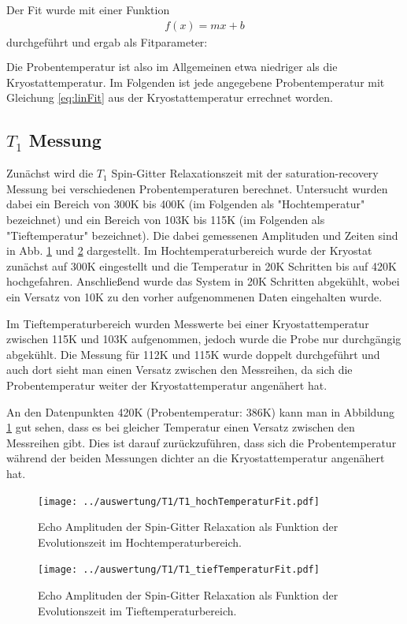 Der Fit wurde mit einer Funktion 
\begin{align}
	f(x) = mx+b
	\label{eq:linFit}
\end{align}
durchgeführt und ergab als Fitparameter:
\begin{align*}
	\\
	
\end{align*}
Die Probentemperatur ist also im Allgemeinen etwa niedriger als die Kryostattemperatur. Im Folgenden ist jede angegebene Probentemperatur mit Gleichung \ref{eq:linFit} aus der Kryostattemperatur errechnet worden. 
\subsection{$T_1$ Messung}
Zunächst wird die $T_1$ Spin-Gitter Relaxationszeit mit der saturation-recovery Messung bei verschiedenen Probentemperaturen berechnet. Untersucht wurden dabei ein Bereich von 300K bis 400K (im Folgenden als "Hochtemperatur" bezeichnet) und ein Bereich von 103K bis 115K (im Folgenden als "Tieftemperatur" bezeichnet). Die dabei gemessenen Amplituden und Zeiten sind in Abb. \ref{pic_T1_hoch} und \ref{pic_T1_tief} dargestellt. Im Hochtemperaturbereich wurde der Kryostat zunächst auf 300K eingestellt und die Temperatur in 20K Schritten bis auf 420K hochgefahren. Anschließend wurde das System in 20K Schritten abgekühlt, wobei ein Versatz von 10K zu den vorher aufgenommenen Daten eingehalten wurde.

Im Tieftemperaturbereich wurden Messwerte bei einer Kryostattemperatur zwischen 115K und 103K aufgenommen, jedoch wurde die Probe nur durchgängig abgekühlt.
Die Messung für 112K und 115K wurde doppelt durchgeführt und auch dort sieht man einen Versatz zwischen den Messreihen, da sich die Probentemperatur weiter der Kryostattemperatur angenähert hat.

An den Datenpunkten 420K (Probentemperatur: 386K) kann man in Abbildung \ref{pic_T1_hoch} gut sehen, dass es bei gleicher Temperatur einen Versatz zwischen den Messreihen gibt. Dies ist darauf zurückzuführen, dass sich die Probentemperatur während der beiden Messungen dichter an die Kryostattemperatur angenähert hat.
\begin{figure}[htbp]
	\texttt{[image: ../auswertung/T1/T1\_hochTemperaturFit.pdf]}
	\caption{Echo Amplituden der Spin-Gitter Relaxation als Funktion der Evolutionszeit im Hochtemperaturbereich.}
	\label{pic_T1_hoch}
\end{figure}
\begin{figure}[htbp]
	\texttt{[image: ../auswertung/T1/T1\_tiefTemperaturFit.pdf]}
	\caption{Echo Amplituden der Spin-Gitter Relaxation als Funktion der Evolutionszeit im Tieftemperaturbereich.}
	\label{pic_T1_tief}
\end{figure}


